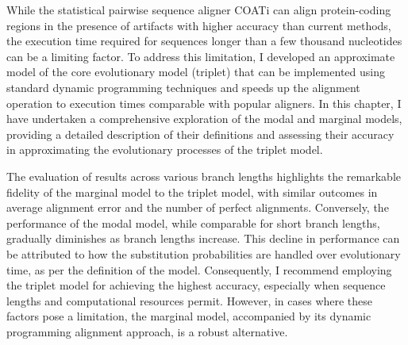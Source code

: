 While the statistical pairwise sequence aligner COATi can align protein-coding regions in the presence of artifacts with higher accuracy than current methods, the execution time required for sequences longer than a few thousand nucleotides can be a limiting factor. To address this limitation, I developed an approximate model of the core evolutionary model (triplet) that can be implemented using standard dynamic programming techniques and speeds up the alignment operation to execution times comparable with popular aligners. In this chapter, I have undertaken a comprehensive exploration of the modal and marginal models, providing a detailed description of their definitions and assessing their accuracy in approximating the evolutionary processes of the triplet model.

The evaluation of results across various branch lengths highlights the remarkable fidelity of the marginal model to the triplet model, with similar outcomes in average alignment error and the number of perfect alignments. Conversely, the performance of the modal model, while comparable for short branch lengths, gradually diminishes as branch lengths increase. This decline in performance can be attributed to how the substitution probabilities are handled over evolutionary time, as per the definition of the model. Consequently, I recommend employing the triplet model for achieving the highest accuracy, especially when sequence lengths and computational resources permit. However, in cases where these factors pose a limitation, the marginal model, accompanied by its dynamic programming alignment approach, is a robust alternative.





